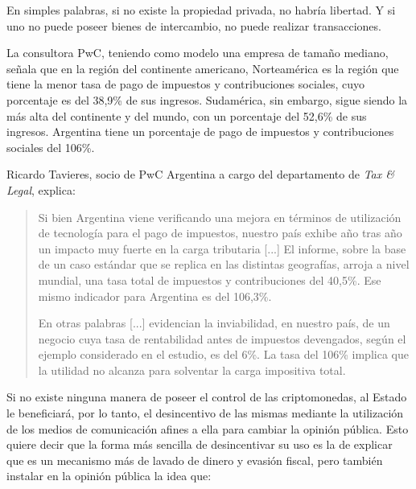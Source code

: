 \documentclass[12pt,a4paper,twoside]{book}
\begin{document}
En simples palabras, si no existe la propiedad privada, no habría libertad. Y si uno no puede poseer bienes de intercambio, no puede realizar transacciones.

La consultora PwC, teniendo como modelo una empresa de tamaño mediano, señala que en la región del continente americano, Norteamérica es la región que tiene la menor tasa de pago de impuestos y contribuciones sociales, cuyo porcentaje es del 38,9\% de sus ingresos. Sudamérica, sin embargo, sigue siendo la más alta del continente y del mundo, con un porcentaje del 52,6\% de sus ingresos. Argentina tiene un porcentaje de pago de impuestos y contribuciones sociales del 106\%.

Ricardo Tavieres, socio de PwC Argentina a cargo del departamento de \textit{Tax \& Legal}, explica:

\begin{quotation}
Si bien Argentina viene verificando una mejora en términos de utilización de tecnología para el pago de impuestos, nuestro país exhibe año tras año un impacto muy fuerte en la carga tributaria [...] El informe, sobre la base de un caso estándar que se replica en las distintas geografías, arroja a nivel mundial, una tasa total de impuestos y contribuciones del 40,5\%. Ese mismo indicador para Argentina es del 106,3\%.

En otras palabras [...] evidencian la inviabilidad, en nuestro país, de un negocio cuya tasa de rentabilidad antes de impuestos devengados, según el ejemplo considerado en el estudio, es del 6\%. La tasa del 106\% implica que la utilidad no alcanza para solventar la carga impositiva total. \cite{pwc:impuestos}
\end{quotation}

Si no existe ninguna manera de poseer el control de las criptomonedas, al Estado le beneficiará, por lo tanto, el desincentivo de las mismas mediante la utilización de los medios de comunicación afines a ella para cambiar la opinión pública. Esto quiere decir que la forma más sencilla de desincentivar su uso es la de explicar que es un mecanismo más de lavado de dinero y evasión fiscal, pero también instalar en la opinión pública la idea que:
\end{document}
